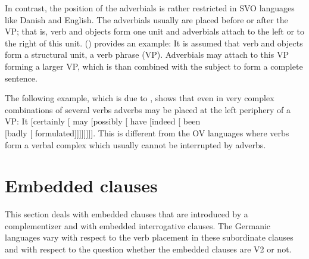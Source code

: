 In contrast, the position of the adverbials is rather restricted in SVO languages like Danish and
English. The adverbials usually are placed before or after the VP; that is, verb and objects form one
unit and adverbials attach to the left or to the right of this unit. () provides an example:
\eal
{}
\zl
It is assumed that verb and objects form a structural unit, a verb phrase (VP). Adverbials may
attach to this VP forming a larger VP, which is than combined with the subject to form a complete sentence.

The following example, which is due to \citet[§ 8.20, 495]{QGLS85a-u}, shows that even in very
complex combinations of several verbs adverbs may be placed at the left periphery of a VP:
\ea
It [certainly [ may [possibly [ have [indeed [ been\\ {}[badly [ formulated]]]]]]]].
\z
This is different from the OV languages where verbs form a verbal complex which usually cannot be
interrupted by adverbs.
\eal
{}
\zl

\section{Embedded clauses}
\label{sec-embeeded-clauses}

This section deals with embedded clauses that are introduced by a complementizer and with
embedded interrogative clauses. The Germanic languages vary with respect to the verb placement in
these subordinate clauses and with respect to the question whether the embedded clauses are V2 or not.

